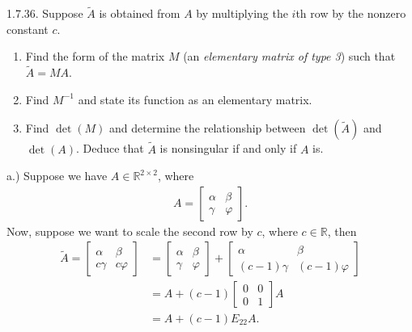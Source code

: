 \documentclass{report}
\begin{document}
    \bigbreak \noindent 
    \begin{mdframed}
        1.7.36. Suppose $\tilde{A}$ is obtained from $A$ by multiplying the $i$th row by the nonzero constant $c$.
        \begin{enumerate}[label=(\alph*)]
            \item Find the form of the matrix $M$ (an \textit{elementary matrix of type 3}) 
                such that $\tilde{A} = M A$.

            \item Find $M^{-1}$ and state its function as an elementary matrix.

            \item Find $\det(M)$ and determine the relationship between $\det(\tilde{A})$ 
                and $\det(A)$. Deduce that $\tilde{A}$ is nonsingular if and only if $A$ is.
        \end{enumerate}
    \end{mdframed}
    \bigbreak \noindent 
    a.) Suppose we have $A \in \mathbb{R}^{2\times 2}$, where 
    \begin{align*}
        A = \begin{bmatrix}
            \alpha & \beta \\
            \gamma & \varphi
        \end{bmatrix}
    .\end{align*}
    Now, suppose we want to scale the second row by $c$, where $c \in \mathbb{R}$, then
    \begin{align*}
        \tilde{A} = \begin{bmatrix}
            \alpha & \beta \\ 
            c\gamma & c\varphi
        \end{bmatrix}
        &= 
        \begin{bmatrix}
            \alpha & \beta \\
            \gamma & \varphi 
        \end{bmatrix}
         + 
         \begin{bmatrix}
             \alpha & \beta \\
             (c-1)\gamma & (c-1)\varphi
         \end{bmatrix}
         \\
        &= A + (c-1)\begin{bmatrix}
            0 & 0 \\
            0 & 1
        \end{bmatrix}
        A
        \\
        &= A + (c-1)E_{22}A
    .\end{align*}
\end{document}

